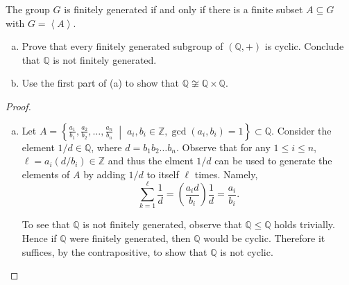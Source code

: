 \documentclass[10pt]{amsart}
\begin{document}
\begin{thm}
  The group $G$ is finitely generated if and only if there is a finite subset $A \subseteq G$ with $G = \left< A \right>$.
  
  \begin{enumerate}[(a)]
  \item
    Prove that every finitely generated subgroup of $(\mathbb{Q}, +)$ is cyclic.
    Conclude that $\mathbb{Q}$ is not finitely generated.
  \item
    Use the first part of (a) to show that $\mathbb{Q} \not \cong \mathbb{Q} \times \mathbb{Q}$.
  \end{enumerate}
  \begin{proof}
    \begin{enumerate}[(a)]
    \item
      Let $A = \left\{\frac{a_1}{b_1}, \frac{a_2}{b_2}, \ldots, \frac{a_n}{b_n} \;\middle\vert\; a_i, b_i \in \mathbb{Z}, \gcd(a_i,b_i) = 1\right\} \subset \mathbb{Q}$.
      Consider the element $1/d \in \mathbb{Q}$, where $d = b_1 b_2 \ldots b_n$.
      Observe that for any $1 \leq i \leq n$, $\ell = a_i(d/b_i) \in \mathbb{Z}$ and thus the elment $1/d$ can be used to generate the elements of $A$ by adding $1/d$ to itself $\ell$ times.
      Namely,
      $$\sum_{k=1}^{\ell} \frac{1}{d} = \left(\frac{a_i d}{b_i}\right)\frac{1}{d} = \frac{a_i}{b_i}.$$
      
      To see that $\mathbb{Q}$ is not finitely generated, observe that $\mathbb{Q} \leq \mathbb{Q}$ holds trivially.
      Hence if $\mathbb{Q}$ were finitely generated, then $\mathbb{Q}$ would be cyclic.
      Therefore it suffices, by the contrapositive, to show that $\mathbb{Q}$ is not cyclic.


\end{enumerate}
\end{proof}
\end{thm}
\end{document}
